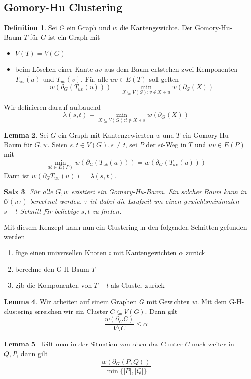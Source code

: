\documentclass[a4paper, 12pt]{article}
\theoremstyle{plain}
\newtheorem{theorem}{Satz}[subsection] %
\theoremstyle{definition}
\newtheorem{definition}[theorem]{Definition} %
\theoremstyle{lemma}
\newtheorem{lemma}[theorem]{Lemma}
\theoremstyle{remark}
\theoremstyle{corollary}
\theoremstyle{example}
\begin{document}
	\subsection{Gomory-Hu Clustering}
	\begin{definition}
		Sei $G$ ein Graph und $w$ die Kantengewichte. Der Gomory-Hu-Baum $T$ für $G$ ist ein Graph mit \begin{itemize}
			\item $V(T) = V(G)$
			\item beim Löschen einer Kante $uv$ aus dem Baum entstehen zwei Komponenten $T_{uv}(u)$ und $T_{uv}(v)$. Für alle $uv \in E(T)$ soll gelten \[w(\partial_G(T_{uv}(u))) = \min_{X\subseteq V(G): v\notin X \ni u} w(\partial_G(X))\] 
		\end{itemize}
		Wir definieren darauf aufbauend \[\lambda(s,t) = \min_{X\subseteq V(G): t \notin X \ni s} w(\partial_G(X))\]
	\end{definition}
	\begin{lemma}
		Sei $G$ ein Graph mit Kantengewichten $w$ und $T$ ein Gomory-Hu-Baum für $G,w$. Seien $s,t \in V(G), s\neq t$, sei $P$ der $st$-Weg in $T$ und $uv \in E(P)$ mit \[\min_{ab \in E(P)} w(\partial_G(T_{ab}(a))) = w(\partial_G(T_{uv}(u)))\] Dann ist $w(\partial_GT_{uv}(u)) = \lambda(s,t)$.
	\end{lemma}
	\begin{theorem}
		Für alle $G,w$ existiert ein Gomory-Hu-Baum. Ein solcher Baum kann in $\mathcal{O}(n\tau)$ berechnet werden. $\tau$ ist dabei die Laufzeit um einen gewichtsminimalen $s-t$ Schnitt für beliebige $s,t$ zu finden.
	\end{theorem}
	Mit diesem Konzept kann nun ein Clustering in den folgenden Schritten gefunden werden \begin{enumerate}
		\item füge einen universellen Knoten $t$ mit Kantengewichten $\alpha$ zurück
		\item berechne den G-H-Baum $T$
		\item gib die Komponenten von $T-t$ als Cluster zurück
	\end{enumerate}
	\begin{lemma}
		Wir arbeiten auf einem Graphen $G$ mit Gewichten $w$. Mit dem G-H-clustering erreichen wir ein Cluster $C \subseteq V(G)$. Dann gilt \[\frac{w(\partial_GC)}{\left|V\setminus C\right|} \leq \alpha\]
	\end{lemma}
	\begin{lemma}
		Teilt man in der Situation von oben das Cluster $C$ noch weiter in $Q,P$, dann gilt \[\frac{w(\partial_G(P,Q))}{\min\{\left|P\right|,\left|Q\right|\}}\]
	\end{lemma}
\end{document}

